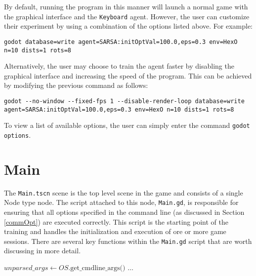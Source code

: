 By default, running the program in this manner will launch a normal game with the graphical interface and the \texttt{Keyboard} agent. However, the user can customize their experiment by using a combination of the options listed above. For example:
\begin{lstlisting}
godot database=write agent=SARSA:initOptVal=100.0,eps=0.3 env=HexO n=10 dists=1 rots=8
\end{lstlisting}

Alternatively, the user may choose to train the agent faster by disabling the graphical interface and increasing the speed of the program. This can be achieved by modifying the previous command as follows:

\begin{lstlisting}
godot --no-window --fixed-fps 1 --disable-render-loop database=write agent=SARSA:initOptVal=100.0,eps=0.3 env=HexO n=10 dists=1 rots=8
\end{lstlisting}

To view a list of available options, the user can simply enter the command \texttt{godot options}.

\section{Main}
The \texttt{Main.tscn} scene is the top level scene in the game and consists of a single Node type node. The script attached to this node, \texttt{Main.gd}, is responsible for ensuring that all options specified in the command line (as discussed in Section \ref{commOpt}) are executed correctly. This script is the starting point of the training and handles the initialization and execution of ore or more game sessions.
There are several key functions within the \texttt{Main.gd} script that are worth discussing in more detail.

\begin{algorithm}
\begin{algorithmic}[1]
\State $unparsed\_args \gets OS.\text{get\_cmdline\_args()}$
\State {}
\EndIf
\State $\dots$ 
\State {}
\Else
\State {}
\State {}
\State {}
\State {}
\EndIf
\State {}
\EndIf
\EndFunction
\end{algorithmic}
\end{algorithm}

